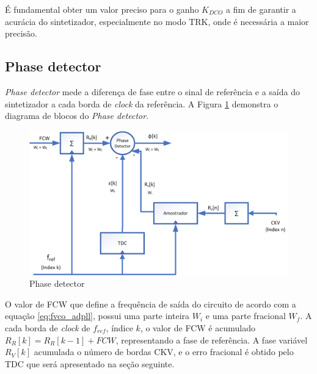 É fundamental obter um valor preciso para o ganho $K_{DCO}$ a fim de garantir a acurácia do sintetizador, especialmente no modo TRK, onde é necessária a maior precisão.



\subsection{Phase detector}
\textit{Phase detector } mede a diferença de fase entre o sinal de referência e a saída do sintetizador a cada borda de \textit{clock} da referência. A Figura \ref{fig:phase_detector_block} demonstra o diagrama de blocos do \textit{Phase detector}.

\begin{figure}[htb]
	\caption{Phase detector}
	\begin{center}
		\includegraphics[scale=0.8]{img/phase_detector_block.png}
	\end{center}
	\label{fig:phase_detector_block}
\end{figure}

O valor de FCW que define a frequência de saída do circuito de acordo com a equação \ref{eq:fvco_adpll}, possui uma parte inteira $W_i$ e uma parte fracional $W_f$. 
 A cada borda de \textit{clock} de $f_{ref}$, índice $k$, o valor de FCW é acumulado $R_R[k] = R_R[k-1] + FCW$, representando a fase de referência. A fase variável $R_V[k]$ acumulada o número de bordas CKV, e o erro fracional é obtido pelo TDC que será apresentado na seção seguinte.

